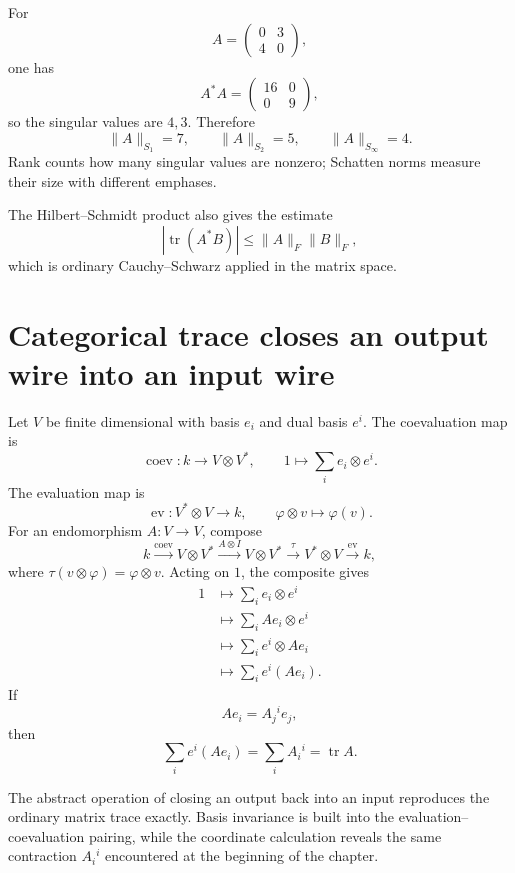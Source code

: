 For
\[
  A=
  \begin{pmatrix}
    0&3\\
    4&0
  \end{pmatrix},
\]
one has
\[
  A^*A=
  \begin{pmatrix}
    16&0\\
    0&9
  \end{pmatrix},
\]
so the singular values are \(4,3\).  Therefore
\[
  \|A\|_{S_1}=7,
  \qquad
  \|A\|_{S_2}=5,
  \qquad
  \|A\|_{S_\infty}=4.
\]
Rank counts how many singular values are nonzero; Schatten norms measure their size with different emphases.

The Hilbert--Schmidt product also gives the estimate
\[
  |\operatorname{tr}(A^*B)|
  \le\|A\|_F\|B\|_F,
\]
which is ordinary Cauchy--Schwarz applied in the matrix space.

\section{Categorical trace closes an output wire into an input wire}

Let \(V\) be finite dimensional with basis \(e_i\) and dual basis \(e^i\).  The coevaluation map is
\[
  \operatorname{coev}:k\to V\otimes V^*,
  \qquad
  1\longmapsto\sum_i e_i\otimes e^i.
\]
The evaluation map is
\[
  \operatorname{ev}:V^*\otimes V\to k,
  \qquad
  \varphi\otimes v\longmapsto\varphi(v).
\]
For an endomorphism \(A:V\to V\), compose
\[
  k
  \xrightarrow{\operatorname{coev}}
  V\otimes V^*
  \xrightarrow{A\otimes I}
  V\otimes V^*
  \xrightarrow{\tau}
  V^*\otimes V
  \xrightarrow{\operatorname{ev}}
  k,
\]
where \(\tau(v\otimes\varphi)=\varphi\otimes v\).  Acting on \(1\), the composite gives
\[
\begin{aligned}
  1
  &\longmapsto
  \sum_i e_i\otimes e^i\\
  &\longmapsto
  \sum_i Ae_i\otimes e^i\\
  &\longmapsto
  \sum_i e^i\otimes Ae_i\\
  &\longmapsto
  \sum_i e^i(Ae_i).
\end{aligned}
\]
If
\[
  Ae_i=A_j{}^i e_j,
\]
then
\[
  \sum_i e^i(Ae_i)
  =\sum_iA_i{}^i
  =\operatorname{tr}A.
\]

The abstract operation of closing an output back into an input reproduces the ordinary matrix trace exactly.  Basis invariance is built into the evaluation--coevaluation pairing, while the coordinate calculation reveals the same contraction \(A_i{}^i\) encountered at the beginning of the chapter.